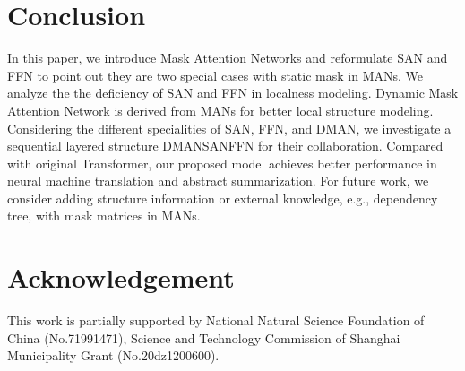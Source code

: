 \documentclass[11pt]{article}
\begin{document}
\section{Conclusion}
In this paper, we introduce Mask Attention Networks and reformulate SAN and FFN to point out they are two special cases with static mask in MANs. We analyze the the deficiency of SAN and FFN in localness modeling. Dynamic Mask Attention Network is derived from MANs for better local structure modeling. Considering the different specialities of SAN, FFN, and DMAN, we investigate a sequential layered structure DMANSANFFN for their collaboration. Compared with original Transformer, our proposed model achieves better performance in neural machine translation and abstract summarization. For future work, we consider adding structure information or external knowledge, e.g., dependency tree, with mask matrices in MANs.

\section{Acknowledgement}
This work is partially supported by National Natural Science Foundation of China (No.71991471), Science and Technology Commission of Shanghai Municipality Grant (No.20dz1200600).



\end{document}
